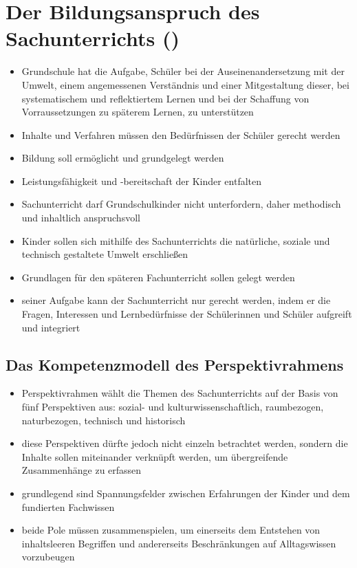 \newpage
\section{Der Bildungsanspruch des Sachunterrichts (\cite{GPS13})}
\begin{itemize}
	\item{Grundschule hat die Aufgabe, Schüler bei der 		Auseinenandersetzung mit der Umwelt, einem angemessenen 	Verständnis und einer Mitgestaltung dieser, bei 		systematischem und reflektiertem Lernen und bei 	der Schaffung von Vorraussetzungen zu späterem Lernen, zu 		unterstützen}
	\item{Inhalte und Verfahren müssen den Bedürfnissen der Schüler gerecht werden}
	\item{Bildung soll ermöglicht und grundgelegt werden}
	\item{Leistungsfähigkeit und -bereitschaft der Kinder entfalten}
	\item{Sachunterricht darf Grundschulkinder nicht unterfordern, daher methodisch und inhaltlich anspruchsvoll}
	\item{Kinder sollen sich mithilfe des Sachunterrichts die natürliche, soziale und technisch gestaltete Umwelt erschließen}
	\item{Grundlagen für den späteren Fachunterricht sollen gelegt werden}
	\item{seiner Aufgabe kann der Sachunterricht nur gerecht werden, indem er die Fragen, Interessen und Lernbedürfnisse der Schülerinnen und Schüler aufgreift und integriert}
\end{itemize}

\subsection{Das Kompetenzmodell des Perspektivrahmens}
\begin{itemize}
	\item{Perspektivrahmen wählt die Themen des Sachunterrichts auf der Basis von fünf Perspektiven aus: sozial- und kulturwissenschaftlich, raumbezogen, naturbezogen, technisch und historisch}
	\item{diese Perspektiven dürfte jedoch nicht einzeln betrachtet werden, sondern die Inhalte sollen miteinander verknüpft werden, um übergreifende Zusammenhänge zu erfassen}
	\item{grundlegend sind Spannungsfelder zwischen Erfahrungen der Kinder und dem fundierten Fachwissen}
	\item{beide Pole müssen zusammenspielen, um einerseits dem Entstehen von inhaltsleeren Begriffen und andererseits Beschränkungen auf Alltagswissen vorzubeugen}
\end{itemize}

